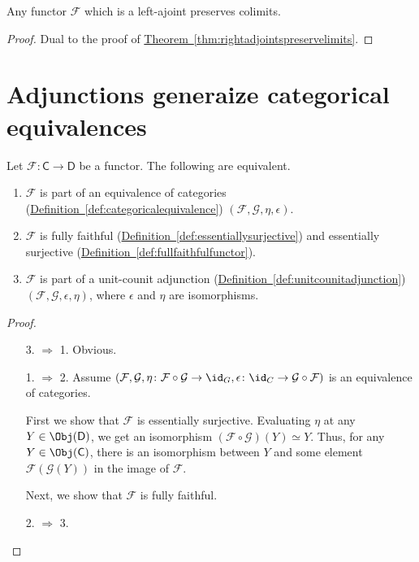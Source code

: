 \documentclass[notes.tex]{subfiles}
\begin{document}
\begin{corollary}
  \label{cor:leftadjointspreservecolimits}
  Any functor $\mathcal{F}$ which is a left-ajoint preserves colimits.
\end{corollary}
\begin{proof}
  Dual to the proof of \hyperref[thm:rightadjointspreservelimits]{Theorem~\ref*{thm:rightadjointspreservelimits}}.
\end{proof}

\section{Adjunctions generaize categorical equivalences}
\label{sec:adjunctions_generaize_categorical_equivalences}

\begin{theorem}
  Let $\mathcal{F}\colon \mathsf{C} \to \mathsf{D}$ be a functor. The following are equivalent.
  \begin{enumerate}
    \item $\mathcal{F}$ is part of an equivalence of categories (\hyperref[def:categoricalequivalence]{Definition~\ref*{def:categoricalequivalence}}) $(\mathcal{F}, \mathcal{G}, \eta, \epsilon)$.

    \item $\mathcal{F}$ is fully faithful (\hyperref[def:essentiallysurjective]{Definition~\ref*{def:essentiallysurjective}}) and essentially surjective (\hyperref[def:fullfaithfulfunctor]{Definition~\ref*{def:fullfaithfulfunctor}}).

    \item $\mathcal{F}$ is part of a unit-counit adjunction (\hyperref[def:unitcounitadjunction]{Definition~\ref*{def:unitcounitadjunction}}) $(\mathcal{F}, \mathcal{G}, \epsilon, \eta)$, where $\epsilon$ and $\eta$ are isomorphisms.
  \end{enumerate}
\end{theorem}
\begin{proof}
  \leavevmode
  \begin{enumerate}
    \item[3. $\Rightarrow$ 1.] Obvious.

    \item[1. $\Rightarrow$ 2.] Assume $(\mathcal{F}, \mathcal{G}, \eta\colon \mathcal{F} \circ \mathcal{G} \to \id_{G}, \epsilon\colon \id_{C} \to \mathcal{G} \circ \mathcal{F})$ is an equivalence of categories. 

      First we show that $\mathcal{F}$ is essentially surjective. Evaluating $\eta$ at any $Y \in \Obj(\mathsf{D})$, we get an isomorphism $(\mathcal{F} \circ \mathcal{G})(Y) \simeq Y$. Thus, for any $Y \in \Obj(\mathsf{C})$, there is an isomorphism between $Y$ and some element $\mathcal{F}(\mathcal{G}(Y))$ in the image of $\mathcal{F}$.

      Next, we show that $\mathcal{F}$ is fully faithful.

    \item[2. $\Rightarrow$ 3.]
  \end{enumerate}
\end{proof}
\end{document}
